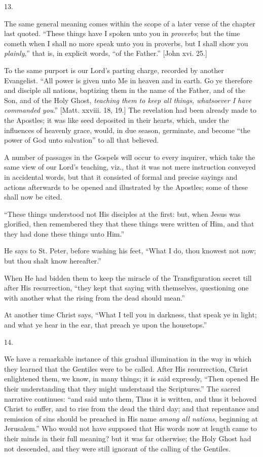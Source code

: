 13.

The same general meaning comes within the scope of a later verse of
the chapter last quoted. ``These things have I spoken unto
you in \emph{proverbs}; but the time cometh when I shall no more speak
unto you in proverbs, but I shall show you \emph{plainly},'' that
is, in explicit words, ``of the Father.'' [John xvi. 25.]

To the same purport is our Lord's parting charge, recorded by
another Evangelist. ``All power is given unto Me in heaven and in
earth. Go ye therefore and disciple all nations, baptizing them in the
name of the Father, and of the Son, and of the Holy Ghost, \emph{teaching
them to keep all things, whatsoever I have commanded you}.''
[Matt. xxviii. 18, 19.] The revelation had been already made to the
Apostles; it was like seed deposited in their hearts, which, under the
influences of heavenly grace, would, in due season, germinate, and
become ``the power of God unto salvation'' to all that
believed.

A number of passages in the Gospels will occur to every inquirer,
which take the same view of our Lord's teaching, viz., that it was not
mere instruction conveyed in accidental words, but that it consisted
of formal and precise sayings and actions afterwards to be opened and
illustrated by the Apostles; some of these shall now be cited.

``These things understood not His disciples at the first: but,
when Jesus was glorified, then remembered they that these things were
written of Him, and that they had done these things unto Him.''

He says to St. Peter, before washing his feet, ``What I do,
thou knowest not now; but thou shalt know hereafter.''

When He had bidden them to keep the miracle of the Transfiguration
secret till after His resurrection, ``they kept that saying with
themselves, questioning one with another what the rising from the dead
should mean.''

At another time Christ says, ``What I tell you in darkness,
that speak ye in light; and what ye hear in the ear, that preach
ye upon the housetops.''

14.

We have a remarkable instance of this gradual illumination in the
way in which they learned that the Gentiles were to be called. After
His resurrection, Christ enlightened them, we know, in many things; it
is said expressly, ``Then opened He their understanding that they
might understand the Scriptures.'' The sacred narrative continues:
``and said unto them, Thus it is written, and thus it behoved
Christ to suffer, and to rise from the dead the third day; and that
repentance and remission of sins should be preached in His name \emph{among
all nations}, beginning at Jerusalem.'' Who would not have
supposed that His words now at length came to their minds in their
full meaning? but it was far otherwise; the Holy Ghost had not
descended, and they were still ignorant of the calling of the
Gentiles.

